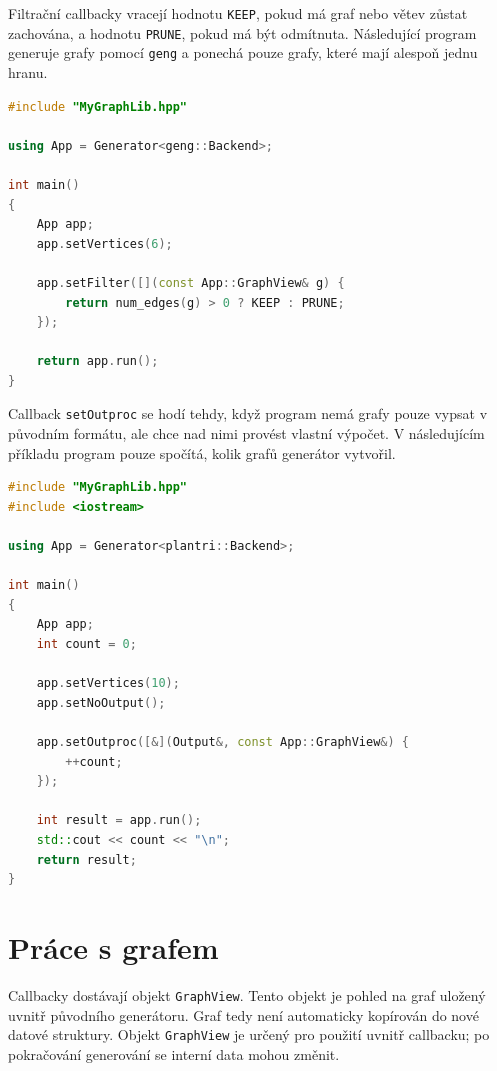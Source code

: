 Filtrační callbacky vracejí hodnotu \texttt{KEEP}, pokud má graf nebo větev
zůstat zachována, a hodnotu \texttt{PRUNE}, pokud má být odmítnuta. Následující
program generuje grafy pomocí \texttt{geng} a ponechá pouze grafy, které mají
alespoň jednu hranu.

\begin{listing}
\begin{lstlisting}[language=C++]
#include "MyGraphLib.hpp"

using App = Generator<geng::Backend>;

int main()
{
    App app;
    app.setVertices(6);

    app.setFilter([](const App::GraphView& g) {
        return num_edges(g) > 0 ? KEEP : PRUNE;
    });

    return app.run();
}
\end{lstlisting}
\caption{Filtrování dokončených grafů pomocí \texttt{setFilter}.}
\label{lst:howto-filter}
\end{listing}

Callback \texttt{setOutproc} se hodí tehdy, když program nemá grafy pouze
vypsat v původním formátu, ale chce nad nimi provést vlastní výpočet. V
následujícím příkladu program pouze spočítá, kolik grafů generátor vytvořil.

\begin{listing}
\begin{lstlisting}[language=C++]
#include "MyGraphLib.hpp"
#include <iostream>

using App = Generator<plantri::Backend>;

int main()
{
    App app;
    int count = 0;

    app.setVertices(10);
    app.setNoOutput();

    app.setOutproc([&](Output&, const App::GraphView&) {
        ++count;
    });

    int result = app.run();
    std::cout << count << "\n";
    return result;
}
\end{lstlisting}
\caption{Vlastní zpracování výstupu pomocí \texttt{setOutproc}.}
\label{lst:howto-outproc}
\end{listing}

\section{Práce s grafem}

Callbacky dostávají objekt \texttt{GraphView}. Tento objekt je pohled na graf
uložený uvnitř původního generátoru. Graf tedy není automaticky kopírován do
nové datové struktury. Objekt \texttt{GraphView} je určený pro použití uvnitř
callbacku; po pokračování generování se interní data mohou změnit.

